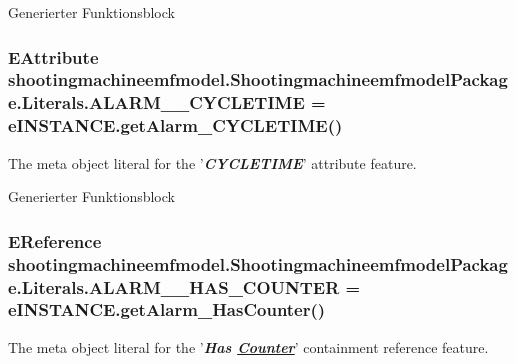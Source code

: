 Generierter Funktionsblock \hypertarget{interfaceshootingmachineemfmodel_1_1_shootingmachineemfmodel_package_1_1_literals_a189117454c5bcbfea11c8b4ad0f7c191}{
\subsubsection[{A\-L\-A\-R\-M\-\_\-\-\_\-\-C\-Y\-C\-L\-E\-T\-I\-M\-E}]{\setlength{\rightskip}{0pt plus 5cm}E\-Attribute shootingmachineemfmodel.\-Shootingmachineemfmodel\-Package.\-Literals.\-A\-L\-A\-R\-M\-\_\-\-\_\-\-C\-Y\-C\-L\-E\-T\-I\-M\-E = e\-I\-N\-S\-T\-A\-N\-C\-E.\-get\-Alarm\-\_\-\-C\-Y\-C\-L\-E\-T\-I\-M\-E()}}\label{interfaceshootingmachineemfmodel_1_1_shootingmachineemfmodel_package_1_1_literals_a189117454c5bcbfea11c8b4ad0f7c191}
The meta object literal for the '{\itshape {\bfseries C\-Y\-C\-L\-E\-T\-I\-M\-E}}' attribute feature.

Generierter Funktionsblock \hypertarget{interfaceshootingmachineemfmodel_1_1_shootingmachineemfmodel_package_1_1_literals_abf4df8fa2e20260ce52dae666db65983}{
\subsubsection[{A\-L\-A\-R\-M\-\_\-\-\_\-\-H\-A\-S\-\_\-\-C\-O\-U\-N\-T\-E\-R}]{\setlength{\rightskip}{0pt plus 5cm}E\-Reference shootingmachineemfmodel.\-Shootingmachineemfmodel\-Package.\-Literals.\-A\-L\-A\-R\-M\-\_\-\-\_\-\-H\-A\-S\-\_\-\-C\-O\-U\-N\-T\-E\-R = e\-I\-N\-S\-T\-A\-N\-C\-E.\-get\-Alarm\-\_\-\-Has\-Counter()}}\label{interfaceshootingmachineemfmodel_1_1_shootingmachineemfmodel_package_1_1_literals_abf4df8fa2e20260ce52dae666db65983}
The meta object literal for the '{\itshape {\bfseries Has \hyperlink{interfaceshootingmachineemfmodel_1_1_counter}{Counter}}}' containment reference feature.

